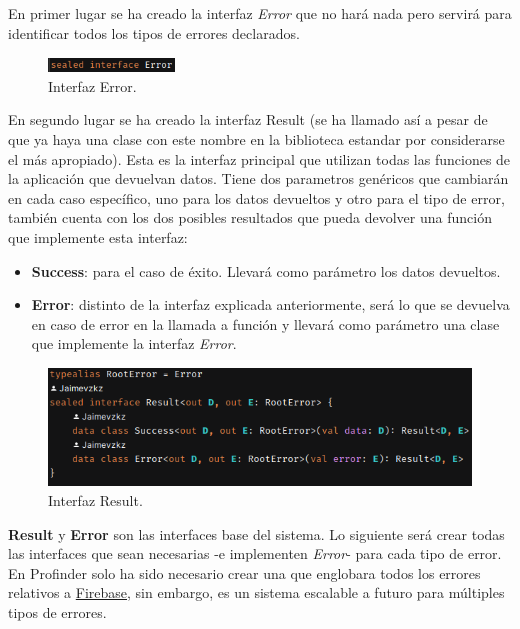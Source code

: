 En primer lugar se ha creado la interfaz \textit{Error} que no hará nada pero servirá para identificar todos los tipos de errores declarados.
\begin{figure}[h]
    \centering
    \includegraphics[width = 0.3\textwidth]{Imagenes/Fuentes/error_interface.png}
    \caption{Interfaz Error.}
    \label{fig:error_interface}
\end{figure}

En segundo lugar se ha creado la interfaz Result (se ha llamado así a pesar de que ya haya una clase con este nombre en la biblioteca estandar por considerarse el más apropiado). Esta es la interfaz principal que utilizan todas las funciones de la aplicación que devuelvan datos. Tiene dos parametros genéricos que cambiarán en cada caso específico, uno para los datos devueltos y otro para el tipo de error, también cuenta con los dos posibles resultados que pueda devolver una función que implemente esta interfaz: 
\begin{itemize}
    \item \textbf{Success}: para el caso de éxito. Llevará como parámetro los datos devueltos.
    \item \textbf{Error}: distinto de la interfaz explicada anteriormente, será lo que se devuelva en caso de error en la llamada a función y llevará como parámetro una clase que implemente la interfaz \textit{Error}.
\end{itemize}
\newpage
\begin{figure}[h]
    \centering
    \includegraphics[width = 1\textwidth]{Imagenes/Fuentes/ejemplo_result.png}
    \caption{Interfaz Result.}
    \label{fig:ejemplo_result}
\end{figure}

\textbf{Result} y \textbf{Error} son las interfaces base del sistema. Lo siguiente será crear todas las interfaces que sean necesarias -e implementen \textit{Error}- para cada tipo de error. En Profinder solo ha sido necesario crear una que englobara todos los errores relativos a \hyperlink{subsec:firebase}{Firebase}, sin embargo, es un sistema escalable a futuro para múltiples tipos de errores.


